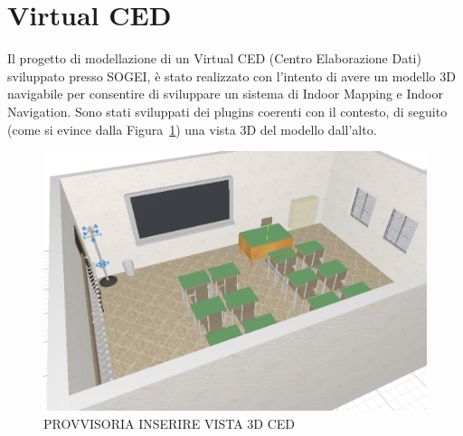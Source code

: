 \section{Virtual CED}
\label{sec:chapter_4_section_3}
Il progetto di modellazione di un Virtual CED (Centro Elaborazione Dati) sviluppato presso SOGEI, \`e stato realizzato con
l'intento di avere un modello 3D navigabile per consentire di sviluppare un sistema di Indoor Mapping e Indoor Navigation.
Sono stati sviluppati dei plugins coerenti con il contesto, di seguito (come si evince dalla Figura~\ref{fig:revit}) una
vista 3D del modello dall'alto.\\
\begin{figure}[htbp] %
   \centering
   \includegraphics[width=1\linewidth]{images/3d-school-2}
   \caption{PROVVISORIA INSERIRE VISTA 3D CED}
   \label{fig:revit}
   \end{figure}

